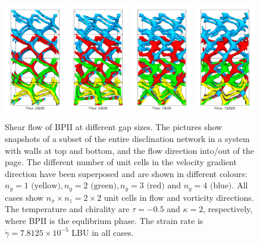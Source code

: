 \documentclass[12pt,twoside]{iopart}
\newcommand{\ex}[1]{\times10^{#1}}
\begin{document}
\begin{figure}[t]
\includegraphics[width=0.24\textwidth]{bp2_t-0o5_k2_25k_y.png}
\includegraphics[width=0.24\textwidth]{bp2_t-0o5_k2_50k_y.png}
\includegraphics[width=0.24\textwidth]{bp2_t-0o5_k2_75k_y.png}
\includegraphics[width=0.24\textwidth]{bp2_t-0o5_k2_100k_y.png}
\caption{Shear flow of BPII at different gap sizes. The pictures show
snapshots of a subset of the entire disclination network in a system
with walls at top and bottom, and the flow direction into/out of the
page. The different number of unit cells in the velocity gradient
direction have been superposed and are shown in different colours:
$n_y=1 \mbox{ (yellow)}, n_y=2 \mbox{ (green)}, n_y=3 \mbox{ (red) and }
n_y=4 \mbox{ (blue)}$. All cases show $n_x \times n_z =2 \times 2$ unit
cells in flow and vorticity directions. The temperature and chirality are
$\tau=-0.5$ and $\kappa=2$, respectively, where BPII is the equlibrium phase.
The strain rate is $\dot{\gamma}=7.8125\ex{-5}$ LBU in all cases.}
\label{fig1}
\end{figure}
\end{document}

